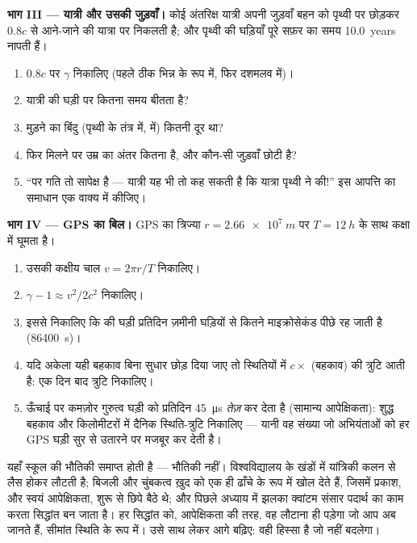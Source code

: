 \begin{problem}
\medskip
\noindent\textbf{भाग III --- यात्री और उसकी जुड़वाँ।}
कोई अंतरिक्ष यात्री अपनी जुड़वाँ बहन को पृथ्वी पर छोड़कर $0.8c$ से आने-जाने की
यात्रा पर निकलती है; और पृथ्वी की घड़ियाँ पूरे सफ़र का समय \qty{10.0}{years} नापती हैं।
\begin{enumerate}[resume]
  \item $0.8c$ पर $\gamma$ निकालिए (पहले ठीक भिन्न के रूप में, फिर दशमलव में)।
  \item यात्री की घड़ी पर कितना समय बीतता है?
  \item मुड़ने का बिंदु (पृथ्वी के तंत्र में,  में) कितनी
        दूर था?
  \item फिर मिलने पर उम्र का अंतर कितना है, और कौन-सी जुड़वाँ छोटी है?
  \item ``पर गति तो सापेक्ष है --- यात्री यह भी तो कह सकती है कि यात्रा
        पृथ्वी ने की!'' इस आपत्ति का समाधान एक वाक्य में कीजिए।
\end{enumerate}

\medskip
\noindent\textbf{भाग IV --- GPS का बिल।}
GPS का  त्रिज्या $r = \qty{2.66e7}{m}$ पर  $T = \qty{12}{h}$ के साथ
कक्षा में घूमता है।
\begin{enumerate}[resume]
  \item उसकी कक्षीय चाल $v = 2\pi r/T$ निकालिए।
  \item $\gamma - 1 \approx v^2/2c^2$ निकालिए।
  \item इससे निकालिए कि  की घड़ी प्रतिदिन ज़मीनी घड़ियों से कितने
        माइक्रोसेकंड पीछे रह जाती है (\qty{86400}{s})।
  \item यदि अकेला यही बहकाव बिना सुधार छोड़ दिया जाए तो स्थितियों में $c \times$
        (बहकाव) की त्रुटि आती है: एक दिन बाद त्रुटि निकालिए।
  \item ऊँचाई पर कमज़ोर गुरुत्व घड़ी को प्रतिदिन \qty{45}{\micro s} \emph{तेज़} कर देता है
        (सामान्य आपेक्षिकता): शुद्ध बहकाव और किलोमीटरों में दैनिक स्थिति-त्रुटि
        निकालिए --- यानी वह संख्या जो अभियंताओं को हर GPS घड़ी सुर से उतारने पर
        मजबूर कर देती है।
\end{enumerate}
\end{problem}

\bigskip
\noindent
यहाँ स्कूल की भौतिकी समाप्त होती है --- भौतिकी नहीं। विश्वविद्यालय के खंडों में
यांत्रिकी कलन से लैस होकर लौटती है; बिजली और चुंबकत्व ख़ुद को एक ही ढाँचे के रूप
में खोल देते हैं, जिसमें प्रकाश, और स्वयं आपेक्षिकता, शुरू से छिपे बैठे थे; और
पिछले अध्याय में झलका क्वांटम संसार पदार्थ का काम करता सिद्धांत बन जाता है। हर
सिद्धांत को, आपेक्षिकता की तरह, वह लौटाना ही पड़ेगा जो आप अब जानते हैं, सीमांत
स्थिति के रूप में। उसे साथ लेकर आगे बढ़िए: वही हिस्सा है जो नहीं बदलेगा।
